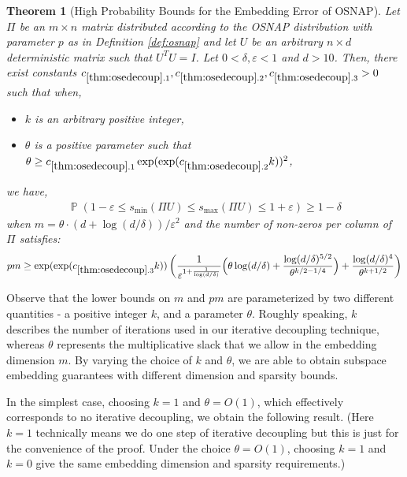 \documentclass[11pt]{amsart}
\numberwithin{equation}{section}
\numberwithin{equation}{section}
\DeclareMathOperator{\Pb}{\mathbb{P}}
\newtheorem{theorem}{Theorem}[section]
\begin{document}
 \begin{theorem}[High Probability Bounds for the Embedding Error of OSNAP]\label{thm:osedecoup}
Let $\Pi$ be an $m \times n$ matrix distributed according to the OSNAP distribution with parameter $p$ as in Definition \ref{def:osnap} and let $U$ be an arbitrary $n \times d$ deterministic matrix such that $U^TU=I$. Let $0 < \delta, \varepsilon < 1$ and $d>10$. Then, there exist constants $c_{\ref{thm:osedecoup}.1}, c_{\ref{thm:osedecoup}.2}, c_{\ref{thm:osedecoup}.3} >0$ such that when,
\begin{itemize}
    \item $k$ is an arbitrary positive integer,
    \item $\theta$ is a positive parameter such that $\theta \ge c_{\ref{thm:osedecoup}.1} \exp(\exp(c_{\ref{thm:osedecoup}.2}k))^2$,
\end{itemize}
we have,
\begin{equation}\label{osepro}
    \begin{aligned}
\Pb \left( 1 - \varepsilon  \leq s_{\min}(\Pi U)   \leq s_{\max}(\Pi U) \leq 1 + \varepsilon \right) \geq 1-\delta
\end{aligned}
\end{equation}
when $m=\theta\cdot(d+\log(d/\delta))/\varepsilon^2$ and the number of non-zeros per column of $\Pi$ satisfies:
\begin{align}
    \begin{aligned} \label{eq:sparsitylb}
    {pm } \ge {\exp(\exp(c_{\ref{thm:osedecoup}.3}k))}\left(\frac{1}{\varepsilon^{1+\frac{1}{\log(d/\delta)}}}\Big(\theta \log(d/\delta)+\frac{\log(d/\delta)^{5/2}}{\theta ^{k/2-1/4}}\Big)+\frac{ \log(d/\delta)^{4}}{\theta ^{k+1/2}}\right)
\end{aligned}
\end{align}

\end{theorem}

Observe that the lower bounds on $m$ and $pm$ are parameterized by two different quantities - a positive integer $k$, and a parameter $\theta$. Roughly speaking, $k$ describes the number of iterations used in our iterative decoupling technique, whereas $\theta$ represents the multiplicative slack that we allow in the embedding dimension $m$. By varying the choice of $k$ and $\theta$, we are able to obtain subspace embedding guarantees with different dimension and sparsity bounds.

In the simplest case, choosing $k=1$ and $\theta = O(1)$, which effectively corresponds to no iterative decoupling, we obtain the following result. (Here $k=1$ technically means we do one step of iterative decoupling but this is just for the convenience of the proof. Under the choice $\theta = O(1)$, choosing $k=1$ and $k=0$ give the same embedding dimension and sparsity requirements.)
\end{document}
